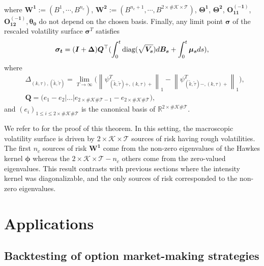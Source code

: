 \documentclass[12pt]{article}
\newcommand{\norm}[1]{\left \lVert #1 \right \rVert_1}
\begin{document}
where $\bm{W^1} := (B^1, \cdots, B^{n_c})$, $\bm{W^2} := (B^{n_c+1}, \cdots, B^{2\times\#\mathcal{K}\times\mathcal{T}})$, $\bm{\Theta^1}$, $\bm{\Theta^2}$, $\bm{O^{(-1)}_{11}}$, $\bm{O^{(-1)}_{12}}, \bm{\theta_0}$ do not depend on the chosen basis.
Finally, any limit point $\boldsymbol{\sigma}$ of the rescaled volatility surface $\boldsymbol{\sigma}^T$ satisfies
\begin{align}\label{vol_rescaled_general_case}
\boldsymbol{\sigma_t} = (\bm{I} + \bm{\Delta}) \bm{Q}^\top (\int^t_0 \textnormal{diag}(\sqrt{\bm{V_s}}) d\bm{B_s} + \int_0^t \bm{\mu_s} ds),    
\end{align}
where 
\begin{align*}
& \Delta_{(k,\tau),(\tilde{k},\tilde{\tau})} = \underset{T \to \infty}{\lim}\Big( \norm{\psi^{T}_{(\tilde{k},\tilde{\tau})+,(k,\tau)+}} - \norm{\psi^{T}_{(\tilde{k},\tilde{\tau})-,(k,\tau)+}} \Big),   \\
& \mathbf{Q}=\big(e_1-e_2|\dots|e_{2\times\#\mathcal{K}\#\mathcal{T}-1}-e_{2\times\#\mathcal{K}\#\mathcal{T}}),
\end{align*}
and $(e_i)_{1\leq i\leq 2\times\#\mathcal{K}\#\mathcal{T}}$ is the canonical basis of $\mathbb{R}^{2\times\#\mathcal{K}\#\mathcal{T}}$. 

\medskip
We refer to \cite{tomas2019microscopic} for the proof of this theorem. In this setting, the macroscopic volatility surface is driven by $2\times\mathcal{K}\times\mathcal{T}$ sources of risk having rough volatilities. The first $n_c$ sources of risk $\mathbf{W^1}$ come from the non-zero eigenvalues of the Hawkes kernel $\boldsymbol{\phi}$ whereas the $2\times\mathcal{K}\times\mathcal{T}-n_c$ others come from the zero-valued eigenvalues. This result contrasts with previous sections where the intensity kernel was diagonalizable, and the only sources of risk corresponded to the non-zero eigenvalues. 

\section{Applications}\label{sec_applications}

\subsection{Backtesting of option market-making strategies}
\end{document}

